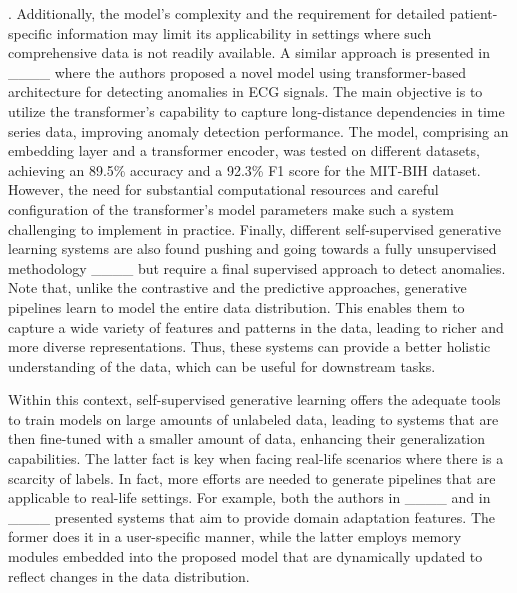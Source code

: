 . Additionally, the model's complexity and the requirement for detailed patient-specific information may limit its applicability in settings where such comprehensive data is not readily available. A similar approach is presented in ____ where the authors proposed a novel model using transformer-based architecture for detecting anomalies in ECG signals. The main objective is to utilize the transformer's capability to capture long-distance dependencies in time series data, improving anomaly detection performance. The model, comprising an embedding layer and a transformer encoder, was tested on different datasets, achieving an 89.5\% accuracy and a 92.3\% F1 score for the MIT-BIH dataset. However, the need for substantial computational resources and careful configuration of the transformer's model parameters make such a system challenging to implement in practice. Finally, different self-supervised generative learning systems are also found pushing and going towards a fully unsupervised methodology ____ but require a final supervised approach to detect anomalies. %
Note that, unlike the contrastive and the predictive approaches, generative pipelines learn to model the entire data distribution. This enables them to capture a wide variety of features and patterns in the data, leading to richer and more diverse representations. Thus, these systems can provide a better holistic understanding of the data, which can be useful for downstream tasks.

Within this context, self-supervised generative learning offers the adequate tools to train models on large amounts of unlabeled data, leading to systems that are then fine-tuned with a smaller amount of data, enhancing their generalization capabilities. The latter fact is key when facing real-life scenarios where there is a scarcity of labels. In fact, more efforts are needed to generate pipelines that are applicable to real-life settings. For example, both the authors in ____ and in ____ presented systems that aim to provide domain adaptation features. The former does it in a user-specific manner, while the latter employs memory modules embedded into the proposed model that are dynamically updated to reflect changes in the data distribution. 


